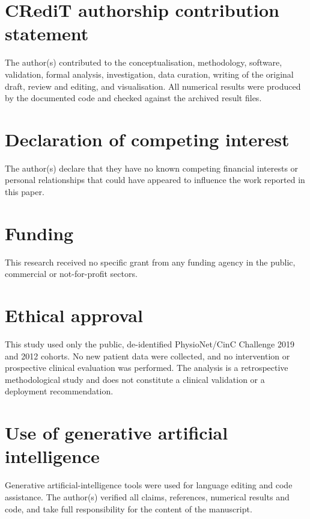 \section*{CRediT authorship contribution statement}
The author(s) contributed to the conceptualisation, methodology, software, validation, formal analysis, investigation, data curation, writing of the original draft, review and editing, and visualisation. All numerical results were produced by the documented code and checked against the archived result files.

\section*{Declaration of competing interest}
The author(s) declare that they have no known competing financial interests or personal relationships that could have appeared to influence the work reported in this paper.

\section*{Funding}
This research received no specific grant from any funding agency in the public, commercial or not-for-profit sectors.

\section*{Ethical approval}
This study used only the public, de-identified PhysioNet/CinC Challenge 2019 and 2012 cohorts. No new patient data were collected, and no intervention or prospective clinical evaluation was performed. The analysis is a retrospective methodological study and does not constitute a clinical validation or a deployment recommendation.

\section*{Use of generative artificial intelligence}
Generative artificial-intelligence tools were used for language editing and code assistance. The author(s) verified all claims, references, numerical results and code, and take full responsibility for the content of the manuscript.
